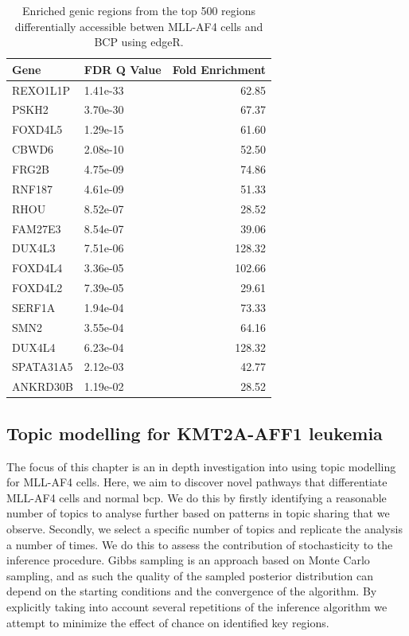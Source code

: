 \begin{table}

    \centering
    \begin{tabular}[t]{llr}
    \toprule
    Gene & FDR Q Value & Fold Enrichment\\
    \midrule
    REXO1L1P & 1.41e-33 & 62.85\\ %
    PSKH2 & 3.70e-30 & 67.37\\ 
    FOXD4L5 & 1.29e-15 & 61.60\\
    CBWD6 & 2.08e-10 & 52.50\\
    FRG2B & 4.75e-09 & 74.86\\
    \addlinespace
    RNF187 & 4.61e-09 & 51.33\\
    RHOU & 8.52e-07 & 28.52\\
    FAM27E3 & 8.54e-07 & 39.06\\
    DUX4L3 & 7.51e-06 & 128.32\\
    FOXD4L4 & 3.36e-05 & 102.66\\
    \addlinespace
    FOXD4L2 & 7.39e-05 & 29.61\\
    SERF1A & 1.94e-04 & 73.33\\
    SMN2 & 3.55e-04 & 64.16\\
    DUX4L4 & 6.23e-04 & 128.32\\
    SPATA31A5 & 2.12e-03 & 42.77\\
    \addlinespace
    ANKRD30B & 1.19e-02 & 28.52\\
    \bottomrule
    \end{tabular}

    \caption{\label{tab:table:mll_edger_genes}Enriched genic regions from the top 500 regions differentially accessible betwen MLL-AF4 cells and BCP using edgeR.}
\end{table}

\subsection{Topic modelling for KMT2A-AFF1 leukemia}

The focus of this chapter is an in depth investigation into using topic modelling for MLL-AF4 cells. Here, we aim to discover novel pathways that differentiate MLL-AF4 cells and normal \gls{bcp}. We do this by firstly identifying a reasonable number of topics to analyse further based on patterns in topic sharing that we observe. Secondly, we select a specific number of topics and replicate the analysis a number of times. We do this to assess the contribution of stochasticity to the inference procedure. Gibbs sampling is an approach based on Monte Carlo sampling, and as such the quality of the sampled posterior distribution can depend on the starting conditions and the convergence of the algorithm. By explicitly taking into account several repetitions of the inference algorithm we attempt to minimize the effect of chance on identified key regions. 

